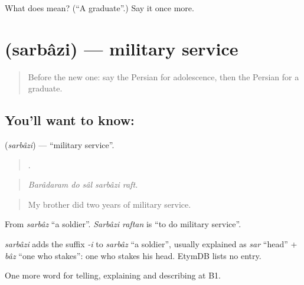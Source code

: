 \begin{tcolorbox}[breakable,colback=teal!4,colframe=teal!35!black,title={Before you move on}]
What does   mean? (\textquotedblleft{}A graduate\textquotedblright{}.) Say it once more.
\end{tcolorbox}
\section[\texorpdfstring{\fa{سربازی} (sarbâzi)}{سربازی (sarbâzi)}]{ (sarbâzi) — military service}

\label{lesson:FA-C333-sarbazi}



\begin{quote}
Before the new one: say the Persian for adolescence, then the Persian for a graduate.
\end{quote}

\subsection*{You'll want to know: }
\textbf{} (\emph{sarbâzi}) — \textquotedblleft{}military service\textquotedblright{}.

\begin{quote}
    .
\end{quote}

\begin{quote}
\emph{Barâdaram do sâl sarbâzi raft.}
\end{quote}

\begin{quote}
My brother did two years of military service.
\end{quote}

From \emph{sarbâz} \textquotedblleft{}a soldier\textquotedblright{}. \emph{Sarbâzi raftan} is \textquotedblleft{}to do military service\textquotedblright{}.

\begin{cousinweb}
\emph{sarbâzi} adds the suffix \emph{-i} to \emph{sarbâz} \textquotedblleft{}a soldier\textquotedblright{}, usually explained as \emph{sar} \textquotedblleft{}head\textquotedblright{} + \emph{bâz} \textquotedblleft{}one who stakes\textquotedblright{}: one who stakes his head. EtymDB lists no entry.
\end{cousinweb}

\begin{grammarlens}[title={What you've built}]
One more word for telling, explaining and describing at B1.
\end{grammarlens}

